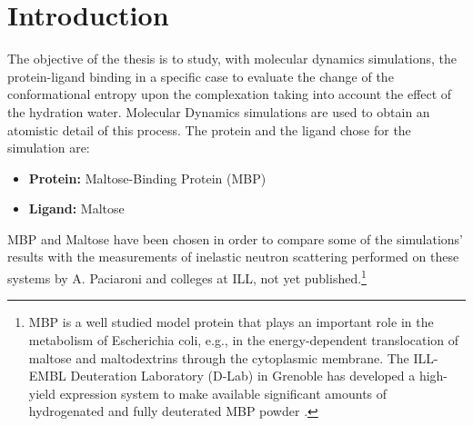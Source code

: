 \chapter*{Introduction} 

The objective of the thesis is to study, with molecular dynamics simulations, the protein-ligand binding in a specific case to evaluate the change of the conformational entropy upon the complexation taking into account the effect of the hydration water. Molecular Dynamics simulations are used to obtain an atomistic detail of this process.
The protein and the ligand chose for the simulation are:
\begin{center}
\begin{minipage}{0.7\textwidth}
\begin{itemize}
\item[] \textbf{Protein:} Maltose-Binding Protein (MBP)
\vspace{-0.2cm}
\item[] \textbf{Ligand:} Maltose
\end{itemize}
\end{minipage}
\end{center}
MBP and Maltose have been chosen in order to compare some of the simulations' results with the measurements of inelastic neutron scattering performed on these systems by A. Paciaroni and colleges at ILL, not yet published.\footnote{MBP is a well studied model protein that plays an important role in the metabolism of Escherichia coli, e.g., in the energy-dependent translocation of maltose and maltodextrins through the cytoplasmic membrane. The ILL-EMBL Deuteration Laboratory (D-Lab) in Grenoble has developed a high-yield expression system to make available significant amounts of hydrogenated and fully deuterated MBP powder
\cite{paciaroni2008fingerprints}.}